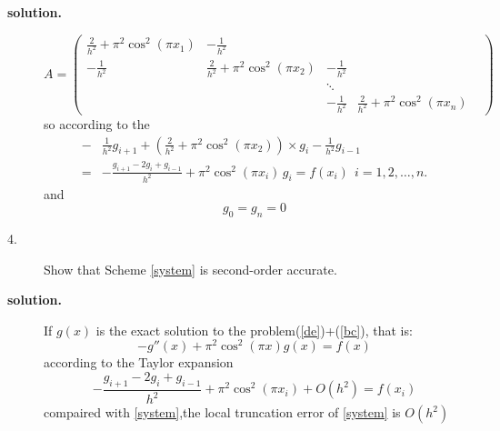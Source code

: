 \documentclass[12pt]{article}
\begin{document}
\begin{description}
\item[\textbf{solution.}]
\begin{equation}
    A=
\begin{pmatrix}
    \frac{2}{h^2} + \pi^2 \cos^2(\pi x_1) & -\frac{1}{h^2} & &  \\
    -\frac{1}{h^2} & \frac{2}{h^2} + \pi^2 \cos^2(\pi x_2) & -\frac{1}{h^2} & \\
     &  & \ddots & & \\
     & & -\frac{1}{h^2} & \frac{2}{h^2} + \pi^2 \cos^2(\pi x_n)
\end{pmatrix}
\end{equation}
so according to the 
\begin{equation}
    \begin{aligned}
    -&\frac{1}{h^2}g_{i+1}+(\frac{2}{h^2} + \pi^2 \cos^2(\pi x_2))\times g_i-\frac{1}{h^2}g_{i-1}\\
    =&- \frac{g_{i+1}-2g_i+g_{i-1}}{h^2}+\pi^2 \cos^2 (\pi x_i )\, g_i = f(x_i)\ 
    \ i=1,2,\dots,n.
    \end{aligned}
\end{equation}
and
\begin{equation}
    g_0=g_n=0
\end{equation}


\item[4.] Show that Scheme  \eqref{system} is second-order accurate.
\item[\textbf{solution.}]
If $g(x)$ is the exact solution to the problem(\ref{de})+(\ref{bc}),
that is:
\begin{equation}
    -g''(x)+\pi^2 \cos^2(\pi x) g(x) = f(x)
\end{equation}
according to the Taylor expansion
\begin{equation}
- \frac{g_{i+1}-2g_i+g_{i-1}}{h^2}+\pi^2 \cos^2 (\pi x_i )+O(h^2)=f(x_i)
\end{equation}
compaired with \eqref{system},the local truncation error of \eqref{system} is $O(h^2)$



\end{description}
\end{document}
